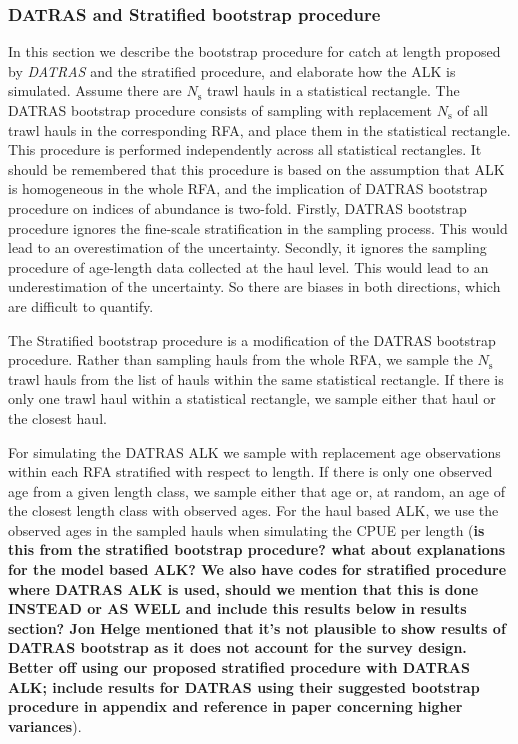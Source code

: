 \documentclass[a4paper 12pt]{article}
\numberwithin{equation}{section}
\begin{document}
\subsubsection{DATRAS and Stratified bootstrap procedure}
\label{sec:datrasstratifiedbootstrap}
In this section we describe the bootstrap procedure for catch at length proposed by \emph{DATRAS} \citep{ICES2013} and the stratified procedure, and elaborate how the ALK is simulated. Assume there are $N_{\text{s}}$ trawl hauls in a statistical rectangle. The DATRAS bootstrap procedure consists of sampling with replacement $N_{\text{s}}$ of all trawl hauls in the corresponding RFA, and place them in the statistical rectangle. This procedure is performed independently across all statistical rectangles. It should be remembered that this procedure is based on the assumption that ALK is homogeneous in the whole RFA, and the implication of DATRAS bootstrap procedure on indices of abundance is two-fold. Firstly, DATRAS bootstrap procedure ignores the fine-scale stratification in the sampling process. This would lead to an overestimation of the uncertainty. Secondly, it ignores the sampling procedure of age-length data collected at the haul level. This would lead  to an underestimation of the uncertainty. So there are biases in both directions, which are difficult to quantify.

The Stratified bootstrap procedure is a modification of the DATRAS bootstrap procedure. Rather than sampling hauls from the whole RFA, we  sample the $N_{\text{s}}$ trawl hauls from the list of hauls within the same statistical rectangle. If there is only one trawl haul within a statistical rectangle, we sample either that haul or the closest haul.

For simulating the DATRAS ALK we sample with replacement age observations within each RFA stratified with respect to length. If there is only one observed age from a given length class, we sample either that age or, at random, an age of the closest length class with observed ages. For the haul based ALK, we use the observed ages in the sampled hauls when simulating the CPUE per length ({\bf is this from the stratified bootstrap procedure? what about explanations for the model based ALK? We also have codes for stratified procedure where DATRAS ALK is used, should we mention that this is done INSTEAD or AS WELL and include this results below in results section? Jon Helge mentioned that it's not plausible to show results of DATRAS bootstrap as it does not account for the survey design. Better off using our proposed stratified procedure with DATRAS ALK; include results for DATRAS using their suggested bootstrap procedure in appendix and reference in paper concerning higher variances}).
\end{document}
